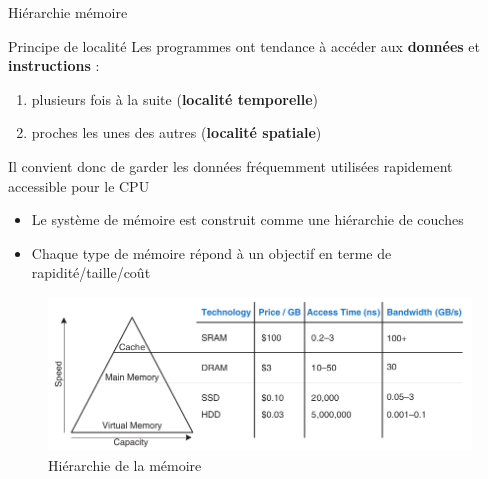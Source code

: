 \documentclass[8pt]{beamer}
\begin{document}
\begin{frame}{Hiérarchie mémoire}
    \begin{block}{Principe de localité}
        Les programmes ont tendance à accéder aux \textbf{données} et
        \textbf{instructions} :
        \begin{enumerate}
            \item plusieurs fois \`a la suite (\textbf{localité temporelle})
            \item proches les unes des autres (\textbf{localité spatiale})
        \end{enumerate}
        Il convient donc de garder les données fréquemment utilisées rapidement
        accessible pour le CPU
    \end{block}
    \begin{itemize}
        \item Le système de mémoire est construit comme une hiérarchie
              de
              couches
        \item Chaque type de m\'emoire r\'epond \`a un objectif en
              terme de
              rapidit\'e/taille/co\^ut
    \end{itemize}

    \begin{figure}
        \centering
        \includegraphics[width=.75\textwidth]{figures/memory_speed_HH.png}
        \caption{Hiérarchie de la mémoire \cite{harris2021digital}}
    \end{figure}

\end{frame}
\end{document}
